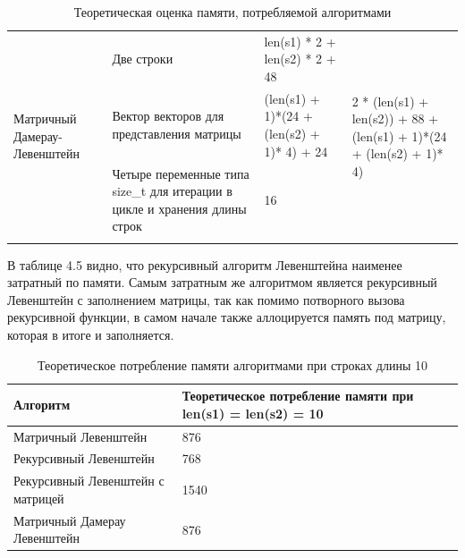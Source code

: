 \documentclass[12pt,a4paper,oneside]{report}
\begin{document}
\begin{longtable}[H]{|p{3cm}|p{3cm}|p{5cm}|p{5cm}|}
	\hline
	\multirow{4}{3cm}{Матричный Дамерау-Левенштейн}                                                                                                                                                            & Две строки                                 & len(s1) * 2 + len(s2) * 2   + 48                    & \multirow{4}{5cm}{2 * (len(s1) + len(s2)) + 88 + (len(s1) + 1)*(24 + (len(s2) + 1)* 4)}                                         \\ 
	\cline{2-3}
	& Вектор векторов для представления матрицы&  (len(s1) + 1)*(24 + (len(s2) + 1)* 4)              + 24                             &                                                                                         \\ 
	\cline{2-3}
	& Четыре переменные типа size\_t для итерации в цикле и хранения длины строк               & 16                                            &                                                                                         \\ 
	\cline{2-3}
	\hline
	\caption{Теоретическая оценка памяти, потребляемой алгоритмами}
\end{longtable}

\qquad В таблице 4.5 видно, что рекурсивный алгоритм Левенштейна наименее затратный  по памяти. Самым затратным же алгоритмом является рекурсивный Левенштейн с заполнением матрицы, так как помимо потворного вызова рекурсивной функции, в самом начале также аллоцируется память под матрицу, которая в итоге и  заполняется.

\begin{table}[H]
	\centering
	\begin{tabular}{|p{5cm}|p{5cm}|} 
		\hline
Алгоритм & Теоретическое потребление памяти при len(s1) = len(s2) = 10  \\ 
		\hline
		Матричный Левенштейн                       & 876                                                         \\ 
		\hline
		Рекурсивный Левенштейн                     & 768                                                         \\ 
		\hline
		Рекурсивный Левенштейн с матрицей          & 1540                                                         \\ 
		\hline
		Матричный Дамерау Левенштейн               & 876                                                         \\
		\hline
	\end{tabular}
	\caption{Теоретическое потребление памяти алгоритмами при строках длины 10}
\end{table}
\end{document}
